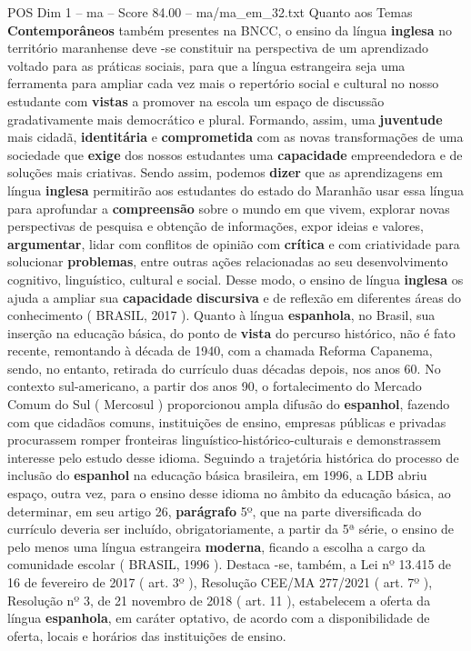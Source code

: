 \begin{textsample}{POS Dim 1 – ma – Score 84.00 – ma/ma\_em\_32.txt}
Quanto aos Temas \textbf{Contemporâneos} também presentes na BNCC, o ensino da língua \textbf{inglesa} no território maranhense deve -se constituir na perspectiva de um aprendizado voltado para as práticas sociais, para que a língua estrangeira seja uma ferramenta para ampliar cada vez mais o repertório social e cultural no nosso estudante com \textbf{vistas} a promover na escola um espaço de discussão gradativamente mais democrático e plural.
Formando, assim, uma \textbf{juventude} mais cidadã, \textbf{identitária} e \textbf{comprometida} com as novas transformações de uma sociedade que \textbf{exige} dos nossos estudantes uma \textbf{capacidade} empreendedora e de soluções mais criativas.
Sendo assim, podemos \textbf{dizer} que as aprendizagens em língua \textbf{inglesa} permitirão aos estudantes do estado do Maranhão usar essa língua para aprofundar a \textbf{compreensão} sobre o mundo em que vivem, explorar novas perspectivas de pesquisa e obtenção de informações, expor ideias e valores, \textbf{argumentar}, lidar com conflitos de opinião com \textbf{crítica} e com criatividade para solucionar \textbf{problemas}, entre outras ações relacionadas ao seu desenvolvimento cognitivo, linguístico, cultural e social.
Desse modo, o ensino de língua \textbf{inglesa} os ajuda a ampliar sua \textbf{capacidade} \textbf{discursiva} e de reflexão em diferentes áreas do conhecimento ( BRASIL, 2017 ).
Quanto à língua \textbf{espanhola}, no Brasil, sua inserção na educação básica, do ponto de \textbf{vista} do percurso histórico, não é fato recente, remontando à década de 1940, com a chamada Reforma Capanema, sendo, no entanto, retirada do currículo duas décadas depois, nos anos 60.
No contexto sul-americano, a partir dos anos 90, o fortalecimento do Mercado Comum do Sul ( Mercosul ) proporcionou ampla difusão do \textbf{espanhol}, fazendo com que cidadãos comuns, instituições de ensino, empresas públicas e privadas procurassem romper fronteiras linguístico-histórico-culturais e demonstrassem interesse pelo estudo desse idioma.
Seguindo a trajetória histórica do processo de inclusão do \textbf{espanhol} na educação básica brasileira, em 1996, a LDB abriu espaço, outra vez, para o ensino desse idioma no âmbito da educação básica, ao determinar, em seu artigo 26, \textbf{parágrafo} 5º, que na parte diversificada do currículo deveria ser incluído, obrigatoriamente, a partir da 5ª série, o ensino de pelo menos uma língua estrangeira \textbf{moderna}, ficando a escolha a cargo da comunidade escolar ( BRASIL, 1996 ).
Destaca -se, também, a Lei nº 13.415 de 16 de fevereiro de 2017 ( art. 3º ), Resolução CEE/MA 277/2021 ( art. 7º ), Resolução nº 3, de 21 novembro de 2018 ( art. 11 ), estabelecem a oferta da língua \textbf{espanhola}, em caráter optativo, de acordo com a disponibilidade de oferta, locais e horários das instituições de ensino.

\end{textsample}
